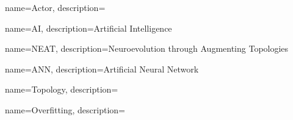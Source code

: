 {
    name=Actor,
    description={}
}

{
    name=AI,
    description={Artificial Intelligence}
}

{
    name=NEAT,
    description={Neuroevolution through Augmenting Topologies}
}

{
    name={ANN},
    description={Artificial Neural Network}
}


{
    name=Topology,
    description={}
}

{
    name=Overfitting,
    description={}
}


\glsaddall
\clearpage
\printglossary[title=Vocabulary, toctitle=Vocabulary]
